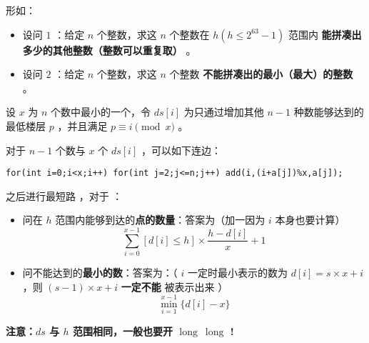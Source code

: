 形如：
\begin{itemize}
    \item 设问 $1$ ：给定 $n$ 个整数，求这 $n$ 个整数在 $h(h\le2^{63}-1)$ 范围内 \textbf{能拼凑出多少的其他整数（整数可以重复取）} 。
    \item 设问 $2$ ：给定 $n$ 个整数，求这 $n$ 个整数 \textbf{不能拼凑出的最小（最大）的整数} 。
\end{itemize}

设 $x$ 为 $n$ 个数中最小的一个，令 $ds[i]$ 为只通过增加其他 $n-1$ 种数能够达到的最低楼层 $p$ ，并且满足 $p\equiv i\pmod{x}$ 。

对于 $n-1$ 个数与 $x$ 个 $ds[i]$ ，可以如下连边：

\begin{verbatim}
for(int i=0;i<x;i++) for(int j=2;j<=n;j++) add(i,(i+a[j])%x,a[j]);
\end{verbatim}

之后进行最短路 ，对于 ：
\begin{itemize}
    \item 问在 $h$ 范围内能够到达的\textbf{点的数量}：答案为（加一因为 $i$ 本身也要计算）
    \[
    \sum_{i=0}^{x-1}{[d[i]\le h]\times\dfrac{h-d[i]}{x}+1}
    \]
    \item 问不能达到的\textbf{最小的数}：答案为：（ $i$ 一定时最小表示的数为 $d[i]=s\times x+i$ ，则 $(s-1)\times x+i$  \textbf{一定不能} 被表示出来 ）
    \[
    \min_{i=1}^{x-1}{\{d[i]-x\}}
    \]
\end{itemize}

\textbf{注意：$ds$ 与 $h$ 范围相同，一般也要开 $\operatorname{long}~\operatorname{long}$ !}